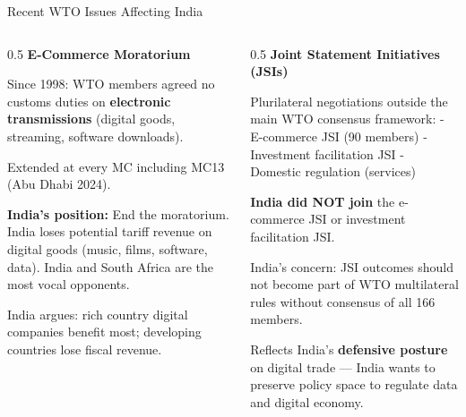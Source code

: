 \documentclass[
  ignorenonframetext,
  aspectratio=169,
]{beamer}
\makeatletter
\let\quarto@originallabel\label
\DeclareRobustCommand*{\label}[1]{\quarto@originallabel{#1}}
\makeatother
\begin{document}
\begin{frame}{Recent WTO Issues Affecting India}
\label{recent-wto-issues-affecting-india}
\begin{columns}[T]
\begin{column}{0.5\linewidth}
\textbf{E-Commerce Moratorium}

Since 1998: WTO members agreed no customs duties on \textbf{electronic
transmissions} (digital goods, streaming, software downloads).

Extended at every MC including MC13 (Abu Dhabi 2024).

\textbf{India's position:} End the moratorium. India loses potential
tariff revenue on digital goods (music, films, software, data). India
and South Africa are the most vocal opponents.

India argues: rich country digital companies benefit most; developing
countries lose fiscal revenue.
\end{column}

\begin{column}{0.5\linewidth}
\textbf{Joint Statement Initiatives (JSIs)}

Plurilateral negotiations outside the main WTO consensus framework: -
E-commerce JSI (90 members) - Investment facilitation JSI - Domestic
regulation (services)

\textbf{India did NOT join} the e-commerce JSI or investment
facilitation JSI.

India's concern: JSI outcomes should not become part of WTO multilateral
rules without consensus of all 166 members.

Reflects India's \textbf{defensive posture} on digital trade --- India
wants to preserve policy space to regulate data and digital economy.
\end{column}
\end{columns}
\end{frame}
\end{document}
